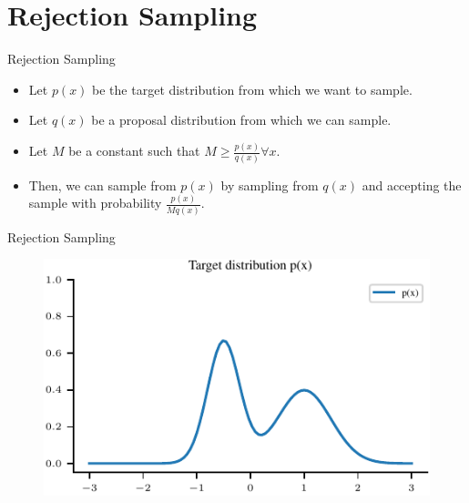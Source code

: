 \documentclass[handout]{beamer}
\begin{document}
    \section{Rejection Sampling}


    \begin{frame}{Rejection Sampling}
        \begin{itemize}
            \item Let $p(x)$ be the target distribution from which we want to sample.
            \item Let $q(x)$ be a proposal distribution from which we can sample.
            \item Let $M$ be a constant such that $M \geq \frac{p(x)}{q(x)} \forall x$.
            \item Then, we can sample from $p(x)$ by sampling from $q(x)$ and accepting the sample with probability $\frac{p(x)}{M q(x)}$.
        \end{itemize}
        
    \end{frame}

   \begin{frame}{Rejection Sampling}
    \begin{figure}
        \centering
        \includegraphics{../figures/sampling/rejection-sampling--1.0-False-False-False-False-False-False-False-False.pdf}
    \end{figure}
    
   \end{frame}
\end{document}
